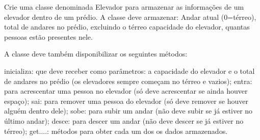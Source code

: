Crie uma classe denominada Elevador para armazenar as informações de um elevador dentro de um prédio.
A classe deve armazenar:
    Andar atual (0=térreo),
    total de andares no prédio, excluindo o térreo
    capacidade do elevador,
    quantas pessoas estão presentes nele.

    A classe deve também disponibilizar os seguintes métodos:

    inicializa: que deve receber como parâmetros: a capacidade do elevador e o total de andares no prédio
                     (os elevadores sempre começam no térreo e vazios);
    entra:       para acrescentar uma pessoa no elevador (só deve acrescentar se ainda houver espaço);
    sai:           para remover uma pessoa do elevador (só deve remover se houver alguém dentro dele);
    sobe:       para subir um andar (não deve subir se já estiver no último andar);
    desce:     para descer um andar (não deve descer se já estiver no térreo);
    get....:      métodos para obter cada um dos os dados armazenados.